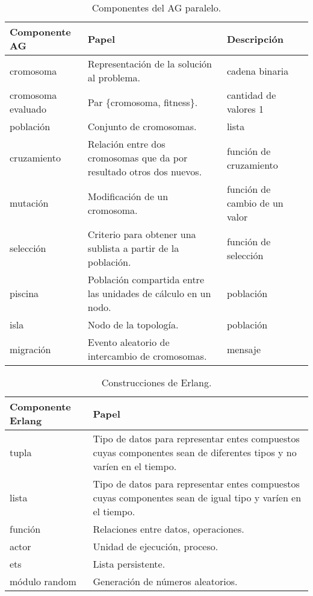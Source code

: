 \documentclass[runningheads]{llncs}
\begin{document}
\begin{table}
  \centering
   \begin{tabular}{|p{3.2cm}|p{5cm}|p{3cm}|}
   \hline
   \textbf{Componente AG} & \textbf{Papel} & \textbf{Descripción}\\
     \hline
      cromosoma & Representación de la solución al problema. & cadena binaria \\
     \hline
      cromosoma evaluado & Par \{cromosoma, fitness\}. & cantidad de valores 1\\
     \hline
      población & Conjunto de cromosomas. & lista\\
     \hline
     cruzamiento & Relación entre dos cromosomas que da por resultado otros dos nuevos. & función de cruzamiento\\
     \hline
      mutación & Modificación de un cromosoma.& función de cambio de un valor\\
     \hline
     selección & Criterio para obtener una sublista a partir de la población. & función de selección\\
     \hline
      piscina & Población compartida entre las unidades de cálculo en un nodo. & población\\
     \hline
      isla & Nodo de la topología. & población\\
     \hline
      migración & Evento aleatorio de intercambio de cromosomas. & mensaje\\
     \hline
   \end{tabular}
  \caption{Componentes del AG paralelo.}\label{agpComp}
\end{table}

\begin{table}
  \centering
\begin{tabular}{|p{3.4cm}|p{7cm}|}
  \hline
  \textbf{Componente Erlang} & \textbf{Papel} \\
     \hline
  tupla & Tipo de datos para representar entes compuestos cuyas componentes sean de diferentes tipos y no varíen en el tiempo. \\
     \hline
  lista & Tipo de datos para representar entes compuestos cuyas componentes sean de igual tipo y varíen en el tiempo. \\
     \hline
  función & Relaciones entre datos, operaciones. \\
     \hline
  actor & Unidad de ejecución, proceso. \\
     \hline
  ets & Lista persistente. \\
     \hline
  módulo random & Generación de números aleatorios. \\
  \hline
\end{tabular}
  \caption{Construcciones de Erlang.}\label{erlComp}
\end{table}
\end{document}
